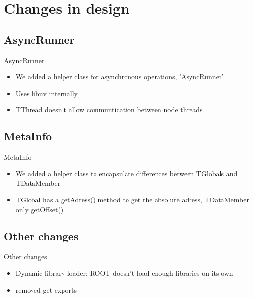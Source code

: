 \section{Changes in design}

\subsection{AsyncRunner}
\begin{frame}{AsyncRunner}
	\begin{itemize}
		\item We added a helper class for asynchronous operations, 'AsyncRunner'
		\item Uses libuv internally
		\item TThread doesn't allow communtication between node threads
	\end{itemize}
\end{frame}

\subsection{MetaInfo}
\begin{frame}{MetaInfo}
	\begin{itemize}
		\item We added a helper class to encapsulate differences between TGlobals and TDataMember
		\item TGlobal has a getAdress() method to get the absolute adress, TDataMember only getOffset()
	\end{itemize}
\end{frame}

\subsection{Other changes}
\begin{frame}{Other changes}
	\begin{itemize}
		\item Dynamic library loader: ROOT doesn't load enough libraries on its own
		\item removed get exports
	\end{itemize}
\end{frame}


